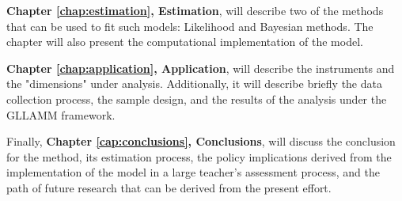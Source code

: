 \textbf{Chapter \ref{chap:estimation}, Estimation}, will describe {\color{red} two} of the methods that can be used to fit such models: {\color{red} Likelihood and Bayesian methods}. The chapter will also present the computational implementation of the model.

\textbf{Chapter \ref{chap:application}, Application}, will describe the instruments and the "dimensions" under analysis. Additionally, it will describe briefly the data collection process, the sample design, and the results of the analysis under the GLLAMM framework.

Finally, \textbf{Chapter \ref{cap:conclusions}, Conclusions}, will discuss the conclusion for the method, its estimation process, the policy implications derived from the implementation of the model in a large teacher's assessment process, and the path of future research that can be derived from the present effort.